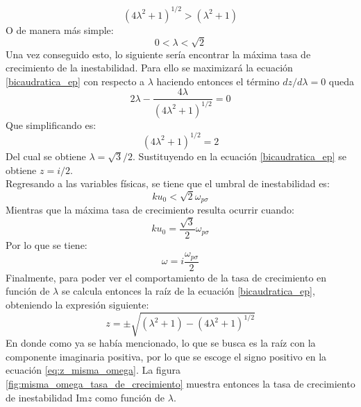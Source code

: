 \documentclass[12pt]{article}
\begin{document}
\begin{equation}
(4 \lambda ^2 + 1)^{1/2} > (\lambda^2 +1 )
\end{equation}
O de manera más simple:
\begin{equation}
0 < \lambda < \sqrt{2}
\end{equation}
Una vez conseguido esto, lo siguiente sería encontrar la máxima tasa de crecimiento de la inestabilidad. Para ello se maximizará  la ecuación \ref{bicaudratica_ep} con respecto a $\lambda$ haciendo entonces el término $dz/d \lambda = 0$ queda
\begin{equation}
2 \lambda - \frac{4 \lambda}{(4 \lambda ^2 + 1)^{1/2}}=0
\end{equation}
Que simplificando es:
\begin{equation}
(4 \lambda ^2 + 1)^{1/2} = 2
\end{equation}
Del cual se obtiene $\lambda = \sqrt{3} / 2$. Sustituyendo en la ecuación \ref{bicaudratica_ep} se obtiene $z = i / 2$.\\
Regresando a las variables físicas, se tiene que el umbral de inestabilidad es:
\begin{equation}
ku_0 < \sqrt{2}\omega_{p \sigma}
\end{equation}
Mientras que la máxima tasa de crecimiento resulta ocurrir cuando:
\begin{equation}
ku_0 = \frac{\sqrt{3}}{2}\omega_{p \sigma}
\end{equation}
Por lo que se tiene:
\begin{equation}
\omega  = i \frac{ \omega_{p \sigma}}{2}
\end{equation}
Finalmente, para poder ver el comportamiento de la tasa de crecimiento en función de $\lambda$ se calcula entonces la raíz de la ecuación \ref{bicaudratica_ep}, obteniendo la expresión siguiente:
\begin{equation}
\label{eq:z_misma_omega}
z = \pm \sqrt{(\lambda^2 +1) - (4 \lambda ^2 + 1)^{1/2}}
\end{equation}
En donde como ya se había mencionado, lo que se busca es la raíz con la componente imaginaria positiva, por lo que se escoge el signo positivo en la ecuación \ref{eq:z_misma_omega}. La figura \ref{fig:misma_omega_tasa_de_crecimiento} muestra entonces la tasa de crecimiento de inestabilidad Im$z$ como función de $\lambda$.
\end{document}
